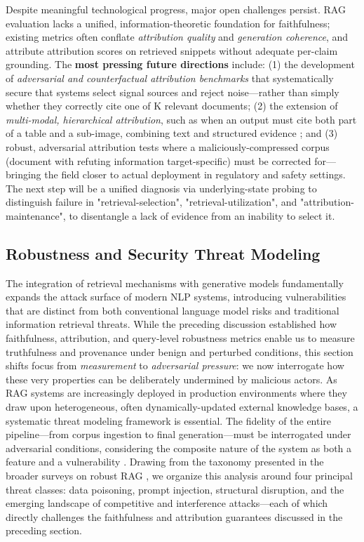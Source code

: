 \documentclass[11pt,a4paper]{article}
\begin{document}
Despite meaningful technological progress, major open challenges persist. RAG evaluation lacks a unified, information-theoretic foundation for faithfulness; existing metrics often conflate \emph{attribution quality} and \emph{generation coherence}, and attribute attribution scores on retrieved snippets without adequate per-claim grounding. The \textbf{most pressing future directions} include: (1) the development of \emph{adversarial and counterfactual attribution benchmarks} that systematically secure that systems select signal sources and reject noise---rather than simply whether they correctly cite one of K relevant documents; (2) the extension of \emph{multi-modal, hierarchical attribution}, such as when an output must cite both part of a table and a sub-image, combining text and structured evidence \cite{arxiv:2504.10074v3}; and (3) robust, adversarial attribution tests where a maliciously-compressed corpus (document with refuting information target-specific) must be corrected for---bringing the field closer to actual deployment in regulatory and safety settings. The next step will be a unified diagnosis via underlying-state probing to distinguish failure in "retrieval-selection", "retrieval-utilization", and "attribution-maintenance", to disentangle a lack of evidence from an inability to select it.


\subsection{Robustness and Security Threat Modeling}


The integration of retrieval mechanisms with generative models fundamentally expands the attack surface of modern NLP systems, introducing vulnerabilities that are distinct from both conventional language model risks and traditional information retrieval threats. While the preceding discussion established how faithfulness, attribution, and query-level robustness metrics enable us to measure truthfulness and provenance under benign and perturbed conditions, this section shifts focus from \emph{measurement} to \emph{adversarial pressure}: we now interrogate how these very properties can be deliberately undermined by malicious actors. As RAG systems are increasingly deployed in production environments where they draw upon heterogeneous, often dynamically-updated external knowledge bases, a systematic threat modeling framework is essential. The fidelity of the entire pipeline---from corpus ingestion to final generation---must be interrogated under adversarial conditions, considering the composite nature of the system as both a feature and a vulnerability \cite{arxiv:2410.12837v1,arxiv:2502.06872v1}. Drawing from the taxonomy presented in the broader surveys on robust RAG \cite{arxiv:2506.00054v1,arxiv:2502.06872v1}, we organize this analysis around four principal threat classes: data poisoning, prompt injection, structural disruption, and the emerging landscape of competitive and interference attacks---each of which directly challenges the faithfulness and attribution guarantees discussed in the preceding section.
\end{document}
